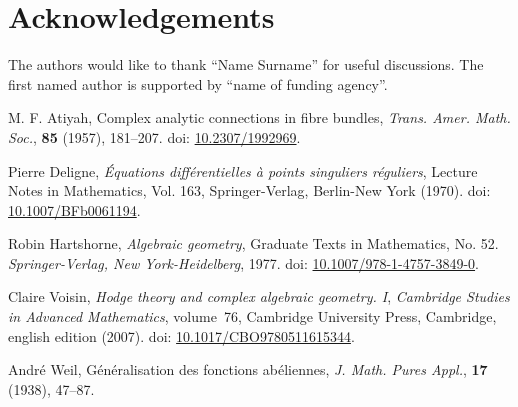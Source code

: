 \documentclass[11pt,leqno]{amsart}
\numberwithin{equation}{subsection}
\theoremstyle{definition}
\begin{document}
\section{Acknowledgements}
\small{The authors would like to thank ``Name Surname'' for useful discussions. 
The first named author is supported by ``name of funding agency''. } 



\begin{thebibliography}{AA}
	\providecommand{\doi}[2][]{doi: \href{https://doi.org/#2}{#2}}
	\providecommand{\arxiv}[2][]{arXiv:\href{https://arxiv.org/abs/#2}{#2}} 
	
	M. F. Atiyah, Complex analytic connections in fibre bundles, 
	\textit{Trans. Amer. Math. Soc.}, \textbf{85} (1957), 181--207. 
	\doi{10.2307/1992969}. 
	
	Pierre Deligne, \textit{\'Equations diff\'erentielles \`a points singuliers r\'eguliers}, 
	Lecture Notes in Mathematics, Vol. 163, Springer-Verlag, Berlin-New York (1970). 
	\doi{10.1007/BFb0061194}. 
	
	Robin Hartshorne, \textit{Algebraic geometry}, Graduate Texts in Mathematics, No. 52. 
	\textit{Springer-Verlag, New York-Heidelberg}, 1977.  
	\doi{10.1007/978-1-4757-3849-0}. 
	
	Claire Voisin, \textit{Hodge theory and complex algebraic geometry. I}, 
	\textit{Cambridge Studies in Advanced Mathematics}, volume~76, 
	Cambridge University Press, Cambridge, english edition (2007). 
	\doi{10.1017/CBO9780511615344}. 
	
	Andr\'e Weil, Généralisation des fonctions abéliennes, 
	\textit{J. Math. Pures Appl.}, \textbf{17} (1938), 47--87. 
	
\end{thebibliography}
\end{document}
